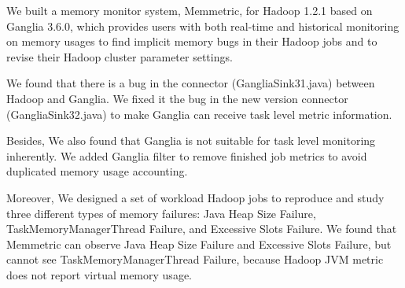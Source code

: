 We built a memory monitor system, Memmetric, for Hadoop 1.2.1 based on Ganglia 3.6.0, which provides users with both real-time and historical monitoring on memory usages to find implicit memory bugs in their Hadoop jobs and to revise their Hadoop cluster parameter settings. 

We found that there is a bug in the connector (GangliaSink31.java) between Hadoop and Ganglia. We fixed it the bug in the new version connector (GangliaSink32.java) to make Ganglia can receive task level metric information.

Besides, We also found that Ganglia is not suitable for task level monitoring inherently. We added Ganglia filter to remove finished job metrics to avoid duplicated memory usage accounting.

Moreover, We designed a set of workload Hadoop jobs to reproduce and study three different types of memory failures: Java Heap Size Failure, TaskMemoryManagerThread Failure, and Excessive Slots Failure. We found that Memmetric can observe Java Heap Size Failure and Excessive Slots Failure, but cannot see TaskMemoryManagerThread Failure, because Hadoop JVM metric does not report virtual memory usage.
